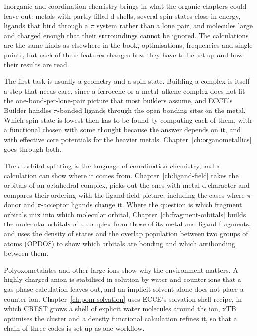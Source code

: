 
Inorganic and coordination chemistry brings in what the organic chapters could leave out: metals with partly filled d shells, several spin states close in energy, ligands that bind through a $\pi$ system rather than a lone pair, and molecules large and charged enough that their surroundings cannot be ignored. The calculations are the same kinds as elsewhere in the book, optimisations, frequencies and single points, but each of these features changes how they have to be set up and how their results are read.

The first task is usually a geometry and a spin state. Building a complex is itself a step that needs care, since a ferrocene or a metal--alkene complex does not fit the one-bond-per-lone-pair picture that most builders assume, and ECCE's Builder handles $\pi$-bonded ligands through the open bonding sites on the metal. Which spin state is lowest then has to be found by computing each of them, with a functional chosen with some thought because the answer depends on it, and with effective core potentials for the heavier metals. Chapter~\ref{ch:organometallics} goes through both.

The d-orbital splitting is the language of coordination chemistry, and a calculation can show where it comes from. Chapter~\ref{ch:ligand-field} takes the orbitals of an octahedral complex, picks out the ones with metal d character and compares their ordering with the ligand-field picture, including the cases where $\pi$-donor and $\pi$-acceptor ligands change it. Where the question is which fragment orbitals mix into which molecular orbital, Chapter~\ref{ch:fragment-orbitals} builds the molecular orbitals of a complex from those of its metal and ligand fragments, and uses the density of states and the overlap population between two groups of atoms (OPDOS) to show which orbitals are bonding and which antibonding between them.

Polyoxometalates and other large ions show why the environment matters. A highly charged anion is stabilised in solution by water and counter ions that a gas-phase calculation leaves out, and an implicit solvent alone does not place a counter ion. Chapter~\ref{ch:pom-solvation} uses ECCE's solvation-shell recipe, in which CREST grows a shell of explicit water molecules around the ion, xTB optimises the cluster and a density functional calculation refines it, so that a chain of three codes is set up as one workflow.
